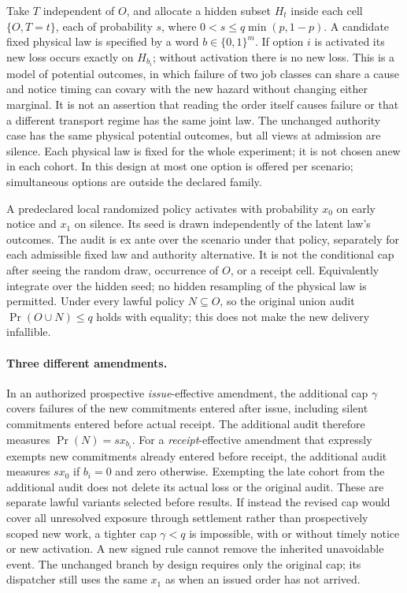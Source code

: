 \documentclass{article}
\begin{document}
Take \(T\) independent of \(O\), and allocate a hidden subset \(H_t\)
inside each cell \(\{O,T=t\}\), each of probability
\(s\), where \(0<s\le q\min(p,1-p)\).
A candidate fixed physical law is specified by a word
\(b\in\{0,1\}^m\). If option \(i\) is activated its new loss occurs
exactly on \(H_{b_i}\); without activation there is no new loss.
This is a model of potential outcomes, in which failure of two job
classes can share a cause and notice timing can covary with the
new hazard without changing either marginal. It is not an assertion
that reading the order itself causes failure or that a different
transport regime has the same joint law. The unchanged authority
case has the same physical potential outcomes, but all views at
admission are silence. Each physical law is fixed for the whole
experiment; it is not chosen anew in each cohort. In this design
at most one option is offered per scenario; simultaneous options
are outside the declared family.

A predeclared local randomized policy activates with probability
\(x_0\) on early notice and \(x_1\) on silence. Its seed is drawn
independently of the latent law's outcomes. The audit is ex ante
over the scenario under that policy, separately for each admissible
fixed law and authority alternative. It is not the conditional
cap after seeing the random draw, occurrence of \(O\), or a receipt
cell. Equivalently integrate over the hidden seed; no hidden
resampling of the physical law is permitted.
Under every lawful policy \(N\subseteq O\), so the original
union audit \(\Pr(O\cup N)\le q\) holds with equality; this
does not make the new delivery infallible.

\paragraph{Three different amendments.}
In an authorized prospective \emph{issue}-effective amendment,
the additional cap \(\gamma\) covers failures of the new commitments
entered after issue, including silent commitments entered before
actual receipt. The additional audit therefore measures
\(\Pr(N)=s x_{b_i}\). For a \emph{receipt}-effective amendment
that expressly exempts new commitments already entered before
receipt, the additional audit measures \(s x_0\) if \(b_i=0\)
and zero otherwise. Exempting the late cohort from the additional
audit does not delete its actual loss or the original audit.
These are separate lawful variants selected before results.
If instead the revised cap would cover all unresolved exposure
through settlement rather than prospectively scoped new work,
a tighter cap \(\gamma<q\) is impossible, with or without
timely notice or new activation. A new signed rule cannot remove
the inherited unavoidable event. The unchanged branch by design
requires only the original cap; its dispatcher still uses the same
\(x_1\) as when an issued order has not arrived.
\end{document}
